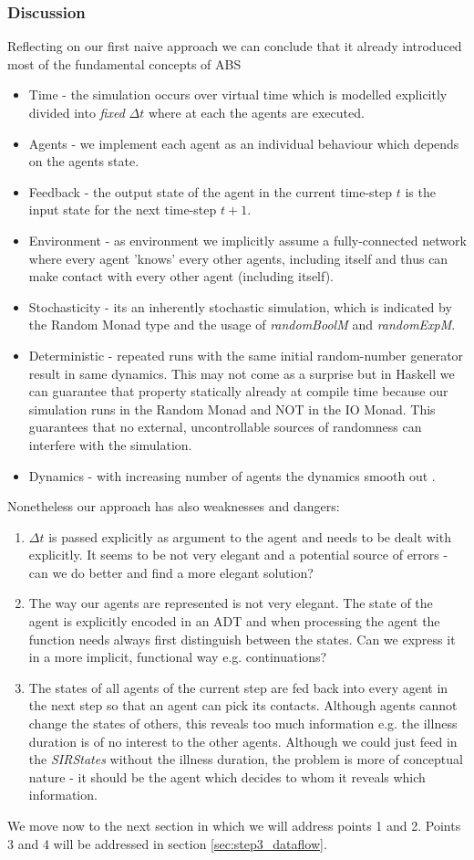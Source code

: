 \subsubsection{Discussion}
Reflecting on our first naive approach we can conclude that it already introduced most of the fundamental concepts of ABS
\begin{itemize}
	\item Time - the simulation occurs over virtual time which is modelled explicitly divided into \textit{fixed} $\Delta t$ where at each the agents are executed.
	\item Agents - we implement each agent as an individual behaviour which depends on the agents state.
	\item Feedback - the output state of the agent in the current time-step $t$ is the input state for the next time-step $t+1$.
	\item Environment - as environment we implicitly assume a fully-connected network where every agent 'knows' every other agents, including itself and thus can make contact with every other agent (including itself).
	\item Stochasticity - its an inherently stochastic simulation, which is indicated by the Random Monad type and the usage of \textit{randomBoolM} and \textit{randomExpM}.
	\item Deterministic - repeated runs with the same initial random-number generator result in same dynamics. This may not come as a surprise but in Haskell we can guarantee that property statically already at compile time because our simulation runs in the Random Monad and NOT in the IO Monad. This guarantees that no external, uncontrollable sources of randomness can interfere with the simulation.
	\item Dynamics - with increasing number of agents the dynamics smooth out \cite{macal_agent-based_2010}.
\end{itemize}

Nonetheless our approach has also weaknesses and dangers:
\begin{enumerate}
	\item $\Delta t$ is passed explicitly as argument to the agent and needs to be dealt with explicitly. It seems to be not very elegant and a potential source of errors - can we do better and find a more elegant solution? 
	\item The way our agents are represented is not very elegant. The state of the agent is explicitly encoded in an ADT and when processing the agent the function needs always first distinguish between the states. Can we express it in a more implicit, functional way e.g. continuations?
	\item The states of all agents of the current step are fed back into every agent in the next step so that an agent can pick its contacts. Although agents cannot change the states of others, this reveals too much information e.g. the illness duration is of no interest to the other agents. Although we could just feed in the \textit{SIRStates} without the illness duration, the problem is more of conceptual nature - it should be the agent which decides to whom it reveals which information.
\end{enumerate}

We move now to the next section in which we will address points 1 and 2. Points 3 and 4 will be addressed in section \ref{sec:step3_dataflow}.